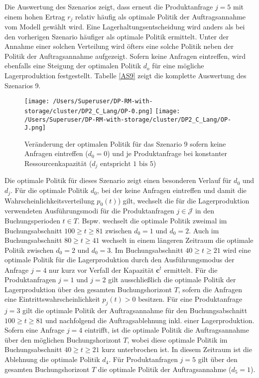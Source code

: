 Die Auswertung des Szenarios zeigt, dass erneut die Produktanfrage $j=5$ mit einem hohen Ertrag $r_j$ relativ häufig als optimale Politik der Auftragsannahme vom Modell gewählt wird. Eine Lagerhaltungsentscheidung wird anders als bei den vorherigen Szenario häufiger als optimale Politik ermittelt. Unter der Annahme einer solchen Verteilung wird öfters eine solche Politik neben der Politik der Auftragsannahme aufgezeigt. Sofern keine Anfragen eintreffen, wird ebenfalls eine Steigung der optimalen Politik $d_o$ für eine mögliche Lagerproduktion festgestellt. Tabelle \ref{AS9} zeigt die komplette Auswertung des Szenarios 9.\\[.5cm]

\begin{figure}[h!]     
\begin{center}
\texttt{[image: /Users/Superuser/DP-RM-with-storage/cluster/DP2\_C\_Lang/OP-0.png]}
\texttt{[image: /Users/Superuser/DP-RM-with-storage/cluster/DP2\_C\_Lang/OP-J.png]}
    \caption{Veränderung der optimalen Politik für das Szenario 9 sofern keine Anfragen eintreffen ($d_0=0$) und je Produktanfrage bei konstanter Ressourcenkapazität ($d_j\text{ entspricht }1\text{ bis }5$)}  \label{SV9}
  \end{center}
\end{figure}

Die optimale Politik für dieses Szenario zeigt einen besonderen Verlauf für $d_0$ und $d_j$. Für die optimale Politik $d_0$, bei der keine Anfragen eintreffen und damit die Wahrscheinlichkeitsverteilung $p_0(t)$) gilt, wechselt die für die Lagerproduktion verwendeten Ausführungsmodi für die Produktanfragen $j\in\mathcal{J}$ in den Buchungsperioden $ t \in T$. Bspw. wechselt die optimale Politik zweimal im Buchungsabschnitt $100\ge t\ge81$ zwischen $d_0=1$ und $d_0=2$. Auch im Buchungsabschnitt $80\ge t\ge41$ wechselt in einem längeren Zeitraum die optimale Politik zwischen $d_0=2$ und $d_0=3$. Im Buchungsabschnitt $40\ge t\ge21$ wird eine optimale Politik für die Lagerproduktion durch den Ausführungsmodus der Anfrage $j=4$ nur kurz vor Verfall der Kapazität $\textbf{c}^{\hat t}$ ermittelt. Für die Produktanfragen $j=1$ und $j=2$ gilt ausschließlich die optimale Politik der Lagerproduktion über den gesamten Buchungshorizont $T$, sofern die Anfragen eine Eintrittswahrscheinlichkeit $p_j(t)>0$ besitzen. Für eine Produktanfrage $j=3$ gilt die optimale Politik der Auftragsannahme für den Buchungsabschnitt $100\ge t\ge81$ und nachfolgend die Auftragsablehnung inkl. einer Lagerproduktion. Sofern eine Anfrage $j=4$ eintrifft, ist die optimale Politik die Auftragsannahme über den möglichen Buchungshorizont $T$, wobei diese optimale Politik im Buchungsabschnitt $40\ge t\ge21$ kurz unterbrochen ist. In diesem Zeitraum ist die Ablehnung die optimale Politik $d_4$. Für Produktanfragen $j=5$ gilt über den gesamten Buchungshorizont $T$ die optimale Politik der Auftragsannahme ($d_5=1$). 




